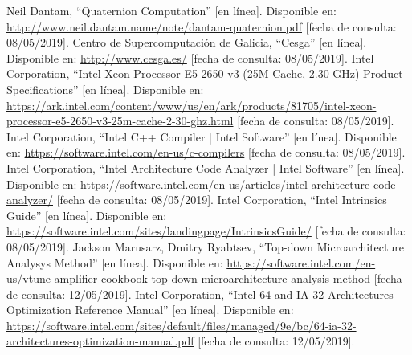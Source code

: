 \documentclass[conference]{IEEEtran}
\begin{document}
\begin{thebibliography}{00}
 Neil Dantam, ``Quaternion Computation'' [en línea]. Disponible en: \url{http://www.neil.dantam.name/note/dantam-quaternion.pdf} [fecha de consulta: 08/05/2019].
 Centro de Supercomputación de Galicia, ``Cesga'' [en línea]. Disponible en: \url{http://www.cesga.es/} [fecha de consulta: 08/05/2019].
 Intel Corporation, ``Intel Xeon Processor E5-2650 v3 (25M Cache, 2.30 GHz) Product Specifications'' [en línea]. Disponible en: \url{https://ark.intel.com/content/www/us/en/ark/products/81705/intel-xeon-processor-e5-2650-v3-25m-cache-2-30-ghz.html} [fecha de consulta: 08/05/2019].
 Intel Corporation, ``Intel C++ Compiler | Intel Software'' [en línea]. Disponible en: \url{https://software.intel.com/en-us/c-compilers} [fecha de consulta: 08/05/2019].
 Intel Corporation, ``Intel Architecture Code Analyzer | Intel Software'' [en línea]. Disponible en: \url{https://software.intel.com/en-us/articles/intel-architecture-code-analyzer/} [fecha de consulta: 08/05/2019].
 Intel Corporation, ``Intel Intrinsics Guide'' [en línea]. Disponible en: \url{https://software.intel.com/sites/landingpage/IntrinsicsGuide/} [fecha de consulta: 08/05/2019].
 Jackson Marusarz, Dmitry Ryabtsev, ``Top-down Microarchitecture Analysys Method'' [en línea]. Disponible en: \url{https://software.intel.com/en-us/vtune-amplifier-cookbook-top-down-microarchitecture-analysis-method} [fecha de consulta: 12/05/2019].
 Intel Corporation, ``Intel 64 and IA-32 Architectures Optimization Reference Manual'' [en línea]. Disponible en: \url{https://software.intel.com/sites/default/files/managed/9e/bc/64-ia-32-architectures-optimization-manual.pdf} [fecha de consulta: 12/05/2019].

\end{thebibliography}
\end{document}
